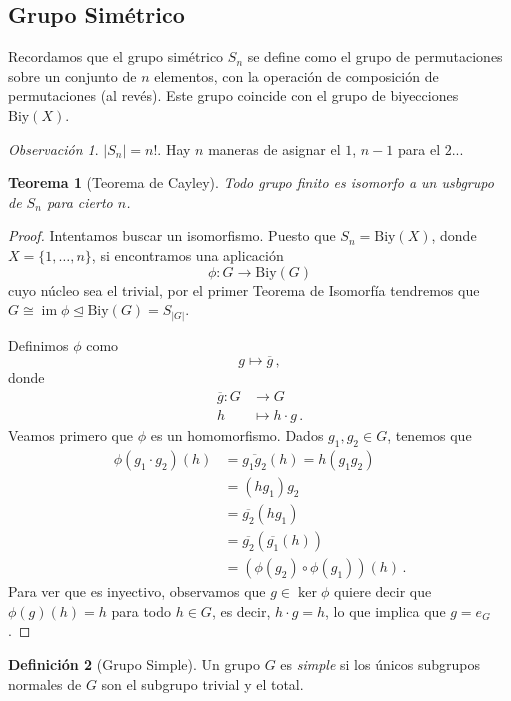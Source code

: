 \documentclass[a4paper,11pt]{amsart}
\DeclareMathOperator{\im}{im}
\theoremstyle{plain}
\newtheorem{thm}{Teorema}[section]
\theoremstyle{definition}
\newtheorem{defi}[thm]{Definición}
\theoremstyle{remark}
\newtheorem*{rem}{Observación}
\begin{document}
\subsection{Grupo Simétrico}

Recordamos que el grupo simétrico $S_n$ se define como el grupo de permutaciones sobre un conjunto de $n$ elementos, con la operación de composición de permutaciones (al revés). Este grupo coincide con el grupo de biyecciones $\text{Biy}(X)$. 

\begin{rem}
$|S_n| = n !$. Hay $n$ maneras de asignar el $1$, $n -1$ para el $2$...
\end{rem}

\begin{thm}[Teorema de Cayley]
Todo grupo finito es isomorfo a un usbgrupo de $S_n$ para cierto $n$.
\end{thm}

\begin{proof}
Intentamos buscar un isomorfismo. Puesto que $S_n = \text{Biy}(X)$, donde $X = \{ 1, \dots , n\}$, si encontramos una aplicación 
\[ \phi \colon G \to \text{Biy}(G)\]
cuyo núcleo sea el trivial, por el primer Teorema de Isomorfía tendremos que $G \cong \im \phi \unlhd \text{Biy}(G) = S_{|G|}$.

Definimos $\phi$ como 
\[ g \mapsto \overline{g} \, ,\]
donde 
\begin{align*}
    \overline{g} \colon G & \to G \\
    h & \mapsto h \cdot g \, .
\end{align*}
Veamos primero que $\phi$ es un homomorfismo. Dados $g_1, g_2 \in G$, tenemos que 
\begin{align*}
    \phi(g_1 \cdot g_2)(h) & = \overline{g_1g_2}(h) = h (g_1g_2)\\
    & = (hg_1)g_2\\
    & = \overline{g_2}(h g_1)\\
    & = \overline{g_2}(\overline{g_1}(h))\\
    & = (\phi(g_2) \circ \phi(g_1))(h) \, .
\end{align*}
Para ver que es inyectivo, observamos que $g \in \ker \phi$ quiere decir que $\phi(g)(h) = h$ para todo $h \in G$, es decir, $h \cdot g = h$, lo que implica que $g = e_G$.
\end{proof}


\begin{defi}[Grupo Simple]
Un grupo $G$ es \textit{simple} si los únicos subgrupos normales de $G$ son el subgrupo trivial y el total.
\end{defi}
\end{document}
